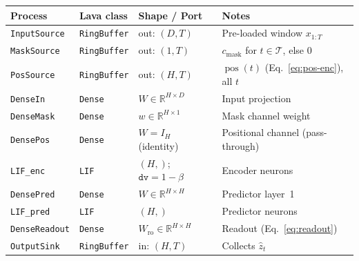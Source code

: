 \documentclass[11pt,a4paper]{article}
\newcommand{\pos}{\operatorname{pos}}      %
\begin{document}
\begin{center}
\renewcommand{\arraystretch}{1.12}
\begin{tabular}{@{}llll@{}}
\toprule
\textbf{Process} & \textbf{Lava class} & \textbf{Shape / Port} &
  \textbf{Notes} \\
\midrule
\texttt{InputSource}
  & \texttt{RingBuffer}
  & out: $(D, T)$
  & Pre-loaded window $x_{1:T}$ \\
\texttt{MaskSource}
  & \texttt{RingBuffer}
  & out: $(1, T)$
  & $c_{\text{mask}}$ for $t\!\in\!\mathcal{T}$, else 0 \\
\texttt{PosSource}
  & \texttt{RingBuffer}
  & out: $(H, T)$
  & $\pos(t)$ (Eq.~\ref{eq:pos-enc}), all $t$ \\
\texttt{DenseIn}
  & \texttt{Dense}
  & $W \!\in\! \mathbb{R}^{H\times D}$
  & Input projection \\
\texttt{DenseMask}
  & \texttt{Dense}
  & $w \!\in\! \mathbb{R}^{H\times 1}$
  & Mask channel weight \\
\texttt{DensePos}
  & \texttt{Dense}
  & $W \!=\! I_{H}$ (identity)
  & Positional channel (pass-through) \\
\texttt{LIF\_enc}
  & \texttt{LIF}
  & $(H,)$; $\texttt{dv}\!=\!1{-}\beta$
  & Encoder neurons \\
\texttt{DensePred}
  & \texttt{Dense}
  & $W \!\in\! \mathbb{R}^{H\times H}$
  & Predictor layer~1 \\
\texttt{LIF\_pred}
  & \texttt{LIF}
  & $(H,)$
  & Predictor neurons \\
\texttt{DenseReadout}
  & \texttt{Dense}
  & $W_{\text{ro}} \!\in\! \mathbb{R}^{H\times H}$
  & Readout (Eq.~\ref{eq:readout}) \\
\texttt{OutputSink}
  & \texttt{RingBuffer}
  & in: $(H, T)$
  & Collects $\hat{z}_t$ \\
\bottomrule
\end{tabular}
\end{center}
\end{document}
